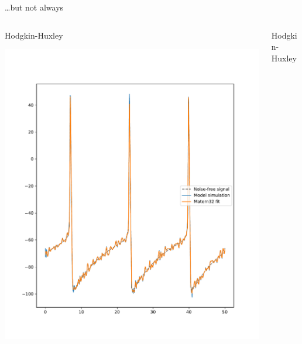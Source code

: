 \documentclass[presentation]{beamer}
\begin{document}
\begin{frame}[plain,label={sec:org0c224a2}]{\ldots{}but not always}
\begin{columns}
\begin{column}{0.5\columnwidth}
\begin{center}
Hodgkin-Huxley
\end{center}

\begin{center}
\includegraphics[width=1.1\textwidth]{./Matern4.pdf}
\end{center}
\end{column}

\begin{column}{0.5\columnwidth}
\begin{center}
Hodgkin-Huxley
\end{center}


\end{column}
\end{columns}
\end{frame}
\end{document}

